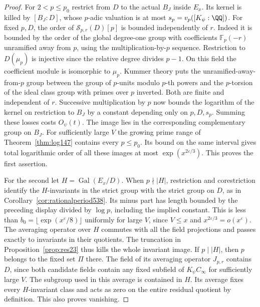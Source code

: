 \documentclass[a4paper,11pt]{article}
\theoremstyle{definition}
\theoremstyle{remark}
\numberwithin{equation}{section}
\begin{document}
\begin{proof}
For \(2<p\le p_0\) restrict from \(D\) to the actual \(B_J\)
inside \(E_x\). Its kernel is killed by \([B_J:D]\), whose
\(p\)-adic valuation is at most \(s_p=v_p([K_\psi:\QQ])\).
For fixed \(p,D\), the order of
\(\mathcal S_{p,r}(D)[p]\) is bounded independently of \(r\).
Indeed it is bounded by the order of the global degree-one
group with coefficients \(\mathbb F_p(-r)\) unramified away
from \(p\), using the multiplication-by-\(p\) sequence.
Restriction to \(D(\mu_p)\) is injective since the relative degree
divides \(p-1\). On this field the coefficient module is isomorphic
to \(\mu_p\). Kummer theory puts the unramified-away-from-\(p\)
group between the group of \(p\)-units modulo \(p\)-th powers
and the \(p\)-torsion of the ideal class group with primes over
\(p\) inverted. Both are finite and independent of \(r\).
Successive multiplication by \(p\) now bounds the logarithm
of the kernel on restriction to \(B_J\) by a constant depending
only on \(p,D,s_p\). Summing these losses costs \(O_\psi(t)\).
The image lies in the corresponding complementary group on \(B_J\).
For sufficiently large \(V\) the growing prime range of
Theorem~\ref{thm:log147} contains every \(p\le p_0\).
Its bound on the same interval gives total logarithmic order
of all these images at most \(\exp(x^{2\varepsilon/3})\).
This proves the first assertion.

For the second let \(H=\operatorname{Gal}(E_x/D)\). When
\(p\nmid |H|\), restriction and corestriction identify the
\(H\)-invariants in the strict group with the strict group on
\(D\), as in Corollary~\ref{cor:rationalperiod538}. Its minus
part has length bounded by the preceding display divided by
\(\log p\), including the implied constant. This is less than
\(b_0=\lfloor\exp(x^\varepsilon/8)\rfloor\) uniformly for large
\(V\), since \(V\le x\) and \(x^{2\varepsilon/3}=o(x^\varepsilon)\).
The averaging operator over \(H\) commutes with all the field
projections and passes exactly to invariants in their quotients.
The truncation in Proposition~\ref{prop:res23} thus kills the
whole invariant image. If \(p\mid |H|\), then \(p\) belongs
to the fixed set \(\Pi\) there. The field of its averaging
operator \(J_{p,r}\) contains \(D\), since both candidate
fields contain any fixed subfield of \(K_\psi C_\infty\) for
sufficiently large \(V\). The subgroup used in this average
is contained in \(H\). Its average fixes every \(H\)-invariant
class and acts as zero on the entire residual quotient by
definition. This also proves vanishing.
\end{proof}
\end{document}
